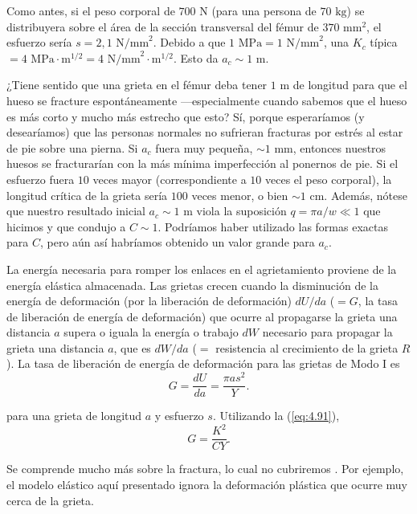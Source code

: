 \documentclass[12pt]{book}
\begin{document}
Como antes, si el peso corporal de $700\text{ N}$ (para una persona de $70\text{ kg}$) se distribuyera sobre el área de la sección transversal del fémur de $370\text{ mm}^2$, el esfuerzo sería $s = 2,1\text{ N/mm}^2$. Debido a que $1\text{ MPa} = 1\text{ N/mm}^2$, una $K_c$ típica $= 4\text{ MPa}\cdot\text{m}^{1/2} = 4\text{ N/mm}^{2}\cdot\text{m}^{1/2}$. Esto da $a_c \sim 1\text{ m}$.

¿Tiene sentido que una grieta en el fémur deba tener $1\text{ m}$ de longitud para que el hueso se fracture espontáneamente ---especialmente cuando sabemos que el hueso es más corto y mucho más estrecho que esto? Sí, porque esperaríamos (y desearíamos) que las personas normales no sufrieran fracturas por estrés al estar de pie sobre una pierna. Si $a_c$ fuera muy pequeña, $\sim 1\text{ mm}$, entonces nuestros huesos se fracturarían con la más mínima imperfección al ponernos de pie. Si el esfuerzo fuera $10$ veces mayor (correspondiente a $10$ veces el peso corporal), la longitud crítica de la grieta sería $100$ veces menor, o bien $\sim 1\text{ cm}$. Además, nótese que nuestro resultado inicial $a_c \sim 1\text{ m}$ viola la suposición $q = \pi a/w \ll 1$ que hicimos y que condujo a $C \sim 1$. Podríamos haber utilizado las formas exactas para $C$, pero aún así habríamos obtenido un valor grande para $a_c$.

La energía necesaria para romper los enlaces en el agrietamiento proviene de la energía elástica almacenada. Las grietas crecen cuando la disminución de la energía de deformación (por la liberación de deformación) $dU/da$ ($= G$, la tasa de liberación de energía de deformación) que ocurre al propagarse la grieta una distancia $a$ supera o iguala la energía o trabajo $dW$ necesario para propagar la grieta una distancia $a$, que es $dW/da$ ($=$ resistencia al crecimiento de la grieta $R$). La tasa de liberación de energía de deformación para las grietas de Modo I es \cite{45}
\begin{equation}
G = \frac{dU}{da} = \frac{\pi a s^2}{Y}.
\label{eq:4.96}
\end{equation}

para una grieta de longitud $a$ y esfuerzo $s$. Utilizando la (\ref{eq:4.91}),
\begin{equation}
G = \frac{K^2}{CY}.
\label{eq:4.97}
\end{equation}

Se comprende mucho más sobre la fractura, lo cual no cubriremos \cite{31,45,70}. Por ejemplo, el modelo elástico aquí presentado ignora la deformación plástica que ocurre muy cerca de la grieta.
\end{document}
